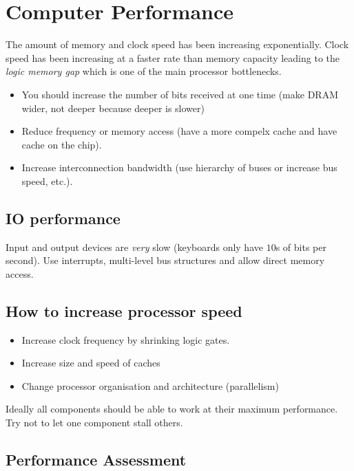 \section{Computer Performance}\label{sec:computer_performance}

The amount of memory and clock speed has been increasing exponentially.
Clock speed has been increasing at a faster rate than memory capacity leading to the \emph{logic memory gap} which is one of the main processor bottlenecks.

\begin{itemize}
	\item You should increase the number of bits received at one time (make DRAM wider, not deeper because deeper is slower)
	\item Reduce frequency or memory access (have a more compelx cache and have cache on the chip).
	\item Increase interconnection bandwidth (use hierarchy of buses or increase bus speed, etc.).
\end{itemize}

\subsection{IO performance}\label{sub:io_performance}

Input and output devices are \emph{very} slow (keyboards only have \(10\)s of bits per second).
Use interrupts, multi-level bus structures and allow direct memory access.

\subsection{How to increase processor speed}\label{sub:how_to_increase_processor_speed}

\begin{itemize}
	\item Increase clock frequency by shrinking logic gates.
	\item Increase size and speed of caches
	\item Change processor organisation and architecture (parallelism)
\end{itemize}
%
Ideally all components should be able to work at their maximum performance.
Try not to let one component stall others.

\subsection{Performance Assessment}\label{sub:performance_asssessment}

